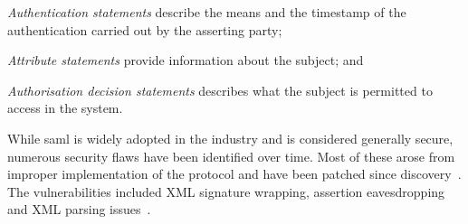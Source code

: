 \begin{enumerate*}[label=(\roman*)]
    \item \textit{Authentication statements} describe the means and the timestamp of the authentication carried out by the asserting party;
    \item \textit{Attribute statements} provide information about the subject; and
    \item \textit{Authorisation decision statements} describes what the subject is permitted to access in the system.
\end{enumerate*}

While \acrshort{saml} is widely adopted in the industry and is considered generally secure, numerous security flaws have been identified over time. Most of these arose from improper implementation of the protocol and have been patched since discovery~\cite{Krawczyk2014SecureAttacks}. The vulnerabilities included XML signature wrapping, assertion eavesdropping~\cite{Chen2014Environment-BoundAssertions} and XML parsing issues~\cite{Degges2018AVulnerability}.
